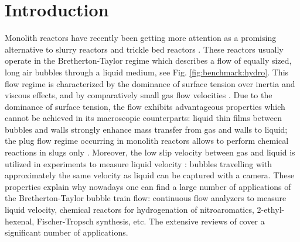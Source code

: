 \documentclass{article}
\begin{document}
\section{Introduction}
\label{intro}
Monolith reactors have recently been getting more attention as a promising alternative to slurry
reactors and trickle bed reactors \cite{kreutzer-overview,bercic-mass}.  These reactors usually operate in
 the Bretherton-Taylor regime \cite{bretherton,taylor} which describes a flow
 of equally sized, long air bubbles through a liquid medium, see
Fig. \ref{fig:benchmark:hydro}. This flow regime
is characterized by the dominance of surface tension over inertia and viscous effects, and by
comparatively small gas flow velocities \cite{yue-mass}. Due to the dominance of surface tension, the flow exhibits advantageous
 properties which cannot be achieved
in its macroscopic counterparts: liquid thin films \cite{bretherton} between bubbles and walls strongly enhance mass
transfer from gas and walls to liquid; the plug flow regime occurring in monolith reactors allows to perform chemical reactions in slugs only \cite{kreutzer-overview}.
 Moreover, the low slip velocity between gas and liquid is utilized in experiments to measure liquid velocity \cite{taylor}:  bubbles
 travelling with approximately the same velocity as liquid can be captured with a camera. These properties explain why nowadays one can find a large number of applications
of the Bretherton-Taylor bubble train flow: continuous flow analyzers to measure liquid velocity, chemical reactors for hydrogenation of nitroaromatics, 2-ethyl-hexenal, Fischer-Tropsch synthesis, etc. The extensive reviews of \citet{kreutzer-overview,
gupta-review,yue-mass} cover a significant number of applications.
\end{document}
